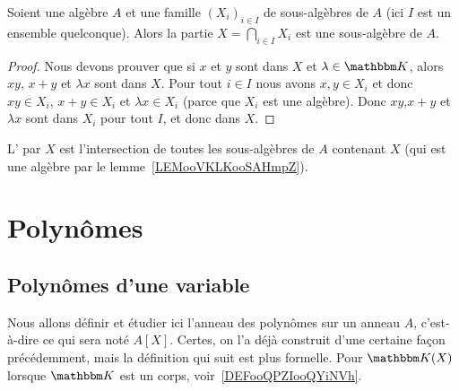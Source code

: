 \begin{lemma}   \label{LEMooVKLKooSAHmpZ}
    Soient une algèbre \( A\) et une famille \( (X_i)_{i\in I}\) de sous-algèbres de \( A\) (ici \( I\) est un ensemble quelconque). Alors la partie \( X=\bigcap_{i\in I}X_i\) est une sous-algèbre de \( A\).
\end{lemma}

\begin{proof}
    Nous devons prouver que si \( x\) et \( y\) sont dans \( X\) et \( \lambda\in \eK\), alors \( xy\), \( x+y\) et \( \lambda x\) sont dans \( X\). Pour tout \( i\in I\) nous avons \( x,y\in X_i\) et donc \( xy\in X_i\), \( x+y\in X_i\) et \( \lambda x\in X_i\) (parce que \( X_i\) est une algèbre). Donc \( xy\),\( x+y\) et \( \lambda x\) sont dans \( X_i\) pour tout \( I\), et donc dans \( X\).
\end{proof}

\begin{definition}\label{DefkAXaWY}
    L' par \( X\) est l'intersection de toutes les sous-algèbres de \( A\) contenant \( X\) (qui est une algèbre par le lemme~\ref{LEMooVKLKooSAHmpZ}).
\end{definition}

\section{Polynômes}
\label{SEC_annPolynomes}

\subsection{Polynômes d'une variable}

Nous allons définir et étudier ici l'anneau des polynômes sur un anneau \( A\), c'est-à-dire ce qui sera noté \( A[X]\). Certes, on l'a déjà construit d'une certaine façon précédemment, mais la définition qui suit est plus formelle. Pour \( \eK(X)\) lorsque \( \eK\) est un corps, voir~\ref{DEFooQPZIooQYiNVh}.

